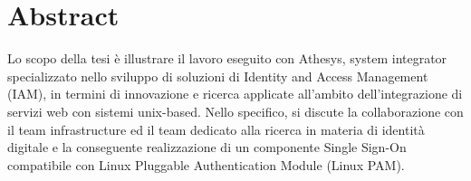 
\cleardoublepage
{}
{}
\begingroup
\let\clearpage\relax
\let\cleardoublepage\relax
\let\cleardoublepage\relax

\chapter*{Abstract}

Lo scopo della tesi è illustrare il lavoro eseguito con Athesys, system integrator specializzato nello sviluppo di soluzioni di Identity and Access Management (IAM), in termini di innovazione e ricerca applicate all'ambito dell'integrazione di servizi web con sistemi unix-based. Nello specifico, si discute la collaborazione con il team infrastructure ed il team dedicato alla ricerca in materia di identità digitale e la conseguente realizzazione di un componente Single Sign-On compatibile con Linux Pluggable Authentication Module (Linux PAM). ​

%
%

\endgroup			

\vfill


